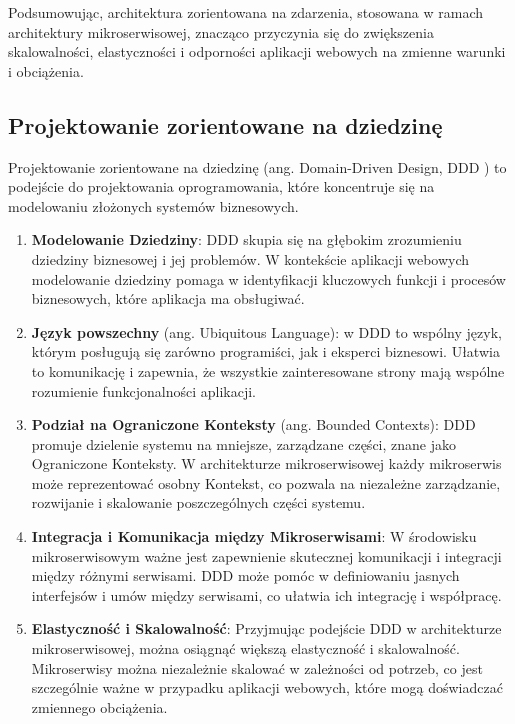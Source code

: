 Podsumowując, architektura zorientowana na zdarzenia, stosowana w ramach architektury mikroserwisowej, znacząco przyczynia się do zwiększenia skalowalności, elastyczności i odporności aplikacji webowych na zmienne warunki i obciążenia.

\subsection{Projektowanie zorientowane na dziedzinę}

Projektowanie zorientowane na dziedzinę (ang. Domain-Driven Design, DDD \cite{ddd}) to podejście do projektowania oprogramowania, które koncentruje się na modelowaniu złożonych systemów biznesowych.

\begin{enumerate}
    \item \textbf{Modelowanie Dziedziny}: DDD skupia się na głębokim zrozumieniu dziedziny biznesowej i jej problemów. W kontekście aplikacji webowych modelowanie dziedziny pomaga w identyfikacji kluczowych funkcji i procesów biznesowych, które aplikacja ma obsługiwać.

    \item \textbf{Język powszechny} (ang. Ubiquitous Language): w DDD to wspólny język, którym posługują się zarówno programiści, jak i eksperci biznesowi. Ułatwia to komunikację i zapewnia, że wszystkie zainteresowane strony mają wspólne rozumienie funkcjonalności aplikacji.

    \item \textbf{Podział na Ograniczone Konteksty }(ang. Bounded Contexts): DDD promuje dzielenie systemu na mniejsze, zarządzane części, znane jako Ograniczone Konteksty. W architekturze mikroserwisowej każdy mikroserwis może reprezentować osobny Kontekst, co pozwala na niezależne zarządzanie, rozwijanie i skalowanie poszczególnych części systemu.

    \item \textbf{Integracja i Komunikacja między Mikroserwisami}: W środowisku mikroserwisowym ważne jest zapewnienie skutecznej komunikacji i integracji między różnymi serwisami. DDD może pomóc w definiowaniu jasnych interfejsów i umów między serwisami, co ułatwia ich integrację i współpracę.

    \item \textbf{Elastyczność i Skalowalność}: Przyjmując podejście DDD w architekturze mikroserwisowej, można osiągnąć większą elastyczność i skalowalność. Mikroserwisy można niezależnie skalować w zależności od potrzeb, co jest szczególnie ważne w przypadku aplikacji webowych, które mogą doświadczać zmiennego obciążenia.


\end{enumerate}
